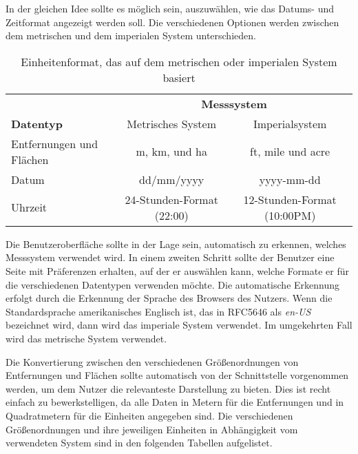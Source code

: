 In der gleichen Idee sollte es möglich sein, auszuwählen, wie das Datums- und Zeitformat angezeigt werden soll.
Die verschiedenen Optionen werden zwischen dem metrischen und dem imperialen System unterschieden.

\begin{table}[H]
  \centering
  \begin{tabular}{l c c}
    \toprule %
                             & \multicolumn{2}{c}{\textbf{Messsystem}}                               \\
    \cmidrule(l){2-3}
    \textbf{Datentyp}        & Metrisches System                       & Imperialsystem              \\
    \midrule %
    Entfernungen und Flächen & m, km, und ha                           & ft, mile und acre           \\
    Datum                    & dd/mm/yyyy                              & yyyy-mm-dd                  \\
    Uhrzeit                  & 24-Stunden-Format (22:00)               & 12-Stunden-Format (10:00PM) \\
  \end{tabular}
  \caption{Einheitenformat, das auf dem metrischen oder imperialen System basiert}
\end{table}

Die Benutzeroberfläche sollte in der Lage sein, automatisch zu erkennen, welches Messsystem verwendet wird.
In einem zweiten Schritt sollte der Benutzer eine Seite mit Präferenzen erhalten, auf der er auswählen kann, welche Formate er für die verschiedenen Datentypen verwenden möchte.
Die automatische Erkennung erfolgt durch die Erkennung der Sprache des Browsers des Nutzers.
Wenn die Standardsprache amerikanisches Englisch ist, das in RFC5646 \cite{rfc5646} als \textit{en-US} bezeichnet wird, dann wird das imperiale System verwendet. Im umgekehrten Fall wird das metrische System verwendet.

Die Konvertierung zwischen den verschiedenen Größenordnungen von Entfernungen und Flächen sollte automatisch von der Schnittstelle vorgenommen werden, um dem Nutzer die relevanteste Darstellung zu bieten.
Dies ist recht einfach zu bewerkstelligen, da alle Daten in Metern für die Entfernungen und in Quadratmetern für die Einheiten angegeben sind.
Die verschiedenen Größenordnungen und ihre jeweiligen Einheiten in Abhängigkeit vom verwendeten System sind in den folgenden Tabellen aufgelistet.

